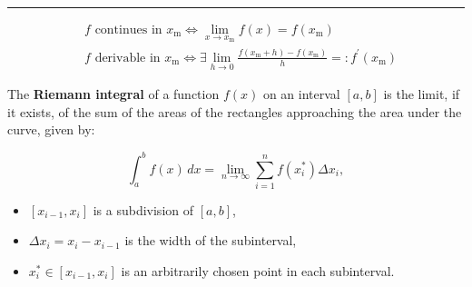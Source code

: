 \hrule
\begin{f} 

\[
\begin{aligned}
& f \text { continues in } x_\mathrm{m} \Leftrightarrow \lim _{x \rightarrow x_\mathrm{m}} f(x)=f\left(x_\mathrm{m}\right) \\
& f \text { derivable in } x_\mathrm{m} \Leftrightarrow \exists \lim _{h \rightarrow 0} \frac{f\left(x_\mathrm{m}+h\right)-f\left(x_\mathrm{m}\right)}{h}=: f^{\prime}\left(x_\mathrm{m}\right)
\end{aligned}
\]
 
The \textbf{Riemann integral} of a function \(f(x)\) on an interval \([a, b]\) is the limit, if it exists, of the sum of the areas of the rectangles approaching the area under the curve, given by:  

\[
\int_a^b f(x) \, dx = \lim_{n \to \infty} \sum_{i=1}^n f(x_i^*) \Delta x_i,
\]
\begin{itemize}
\item \( [x_{i-1}, x_i] \) is a subdivision of \([a, b]\),  
\item \( \Delta x_i = x_i - x_{i-1} \) is the width of the subinterval,  
\item \( x_i^* \in [x_{i-1}, x_i] \) is an arbitrarily chosen point in each subinterval.
\end{itemize}
  

\end{f}
